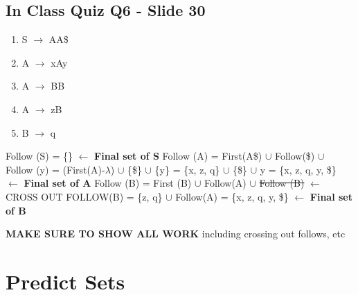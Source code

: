\documentclass{report}
\begin{document}
\subsection{In Class Quiz Q6 - Slide 30}
\vspace{-1.5em}
\begin{multicols}{2}
  \begin{enumerate}
    \setlength\itemsep{-.25em}
    \item S $\rightarrow$ AA\$
    \item A $\rightarrow$ xAy
    \item A $\rightarrow$ BB
    \item A $\rightarrow$ zB
    \item B $\rightarrow$ q\newline\newline
  \end{enumerate}
  \setlength{\leftskip}{-12em}
Follow (S) = \{\} $\leftarrow$ \textbf{Final set of S}\newline
Follow (A) = First(A\$) $\cup$ Follow(\$) $\cup$ Follow (y)\newline
\indent\hspace{1.25cm}= (First(A)-$\lambda$) $\cup$ \{\$\} $\cup$ \{y\}\newline
\indent\hspace{1.25cm}= \{x, z, q\} $\cup$ \{\$\} $\cup$ {y}\newline
\indent\hspace{1.25cm}= \{x, z, q, y, \$\}			$\leftarrow$ \textbf{Final set of A}\newline
Follow (B) = First (B) $\cup$ Follow(A) $\cup$ \st{Follow (B)} $\leftarrow$ CROSS OUT FOLLOW(B)\newline
\indent\hspace{1.25cm}= \{z, q\} $\cup$ Follow(A)\newline
\indent\hspace{1.25cm}= \{x, z, q, y, \$\} 			$\leftarrow$ \textbf{Final set of B}
\end{multicols}
\vspace{-1em}
\textbf{MAKE SURE TO SHOW ALL WORK} including crossing out follows, etc


\section{Predict Sets}
\end{document}
